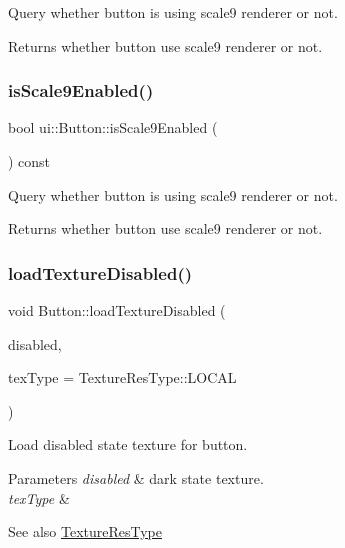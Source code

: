 Query whether button is using scale9 renderer or not. \begin{DoxyReturn}{Returns}
whether button use scale9 renderer or not. 
\end{DoxyReturn}
\mbox{\label{classui_1_1Button_a297bd9b0fa24155a58757fbaa706790d}} 
\subsubsection{\texorpdfstring{is\+Scale9\+Enabled()}{isScale9Enabled()}\hspace{0.1cm}{\footnotesize\ttfamily [2/2]}}
{\footnotesize\ttfamily bool ui\+::\+Button\+::is\+Scale9\+Enabled (\begin{DoxyParamCaption}{ }\end{DoxyParamCaption}) const}

Query whether button is using scale9 renderer or not. \begin{DoxyReturn}{Returns}
whether button use scale9 renderer or not. 
\end{DoxyReturn}
\mbox{\label{classui_1_1Button_aa18dabbf50cbb8b8e049b3e0d9c7767c}} 
\subsubsection{\texorpdfstring{load\+Texture\+Disabled()}{loadTextureDisabled()}\hspace{0.1cm}{\footnotesize\ttfamily [1/2]}}
{\footnotesize\ttfamily void Button\+::load\+Texture\+Disabled (\begin{DoxyParamCaption}\item[{const std\+::string \&}]{disabled,  }\item[{\hyperlink{classui_1_1Widget_a040a65ec5ad3b11119b7e16b98bd9af0}{Texture\+Res\+Type}}]{tex\+Type = {\ttfamily TextureResType\+:\+:LOCAL} }\end{DoxyParamCaption})}

Load disabled state texture for button.


\begin{DoxyParams}{Parameters}
{\em disabled} & dark state texture. \\
\hline
{\em tex\+Type} & \\
\hline
\end{DoxyParams}
\begin{DoxySeeAlso}{See also}
{\ttfamily \hyperlink{classui_1_1Widget_a040a65ec5ad3b11119b7e16b98bd9af0}{Texture\+Res\+Type}} 
\end{DoxySeeAlso}
\mbox{\label{classui_1_1Button_af2dce2aa5d654addd44311d9c5180767}} 
